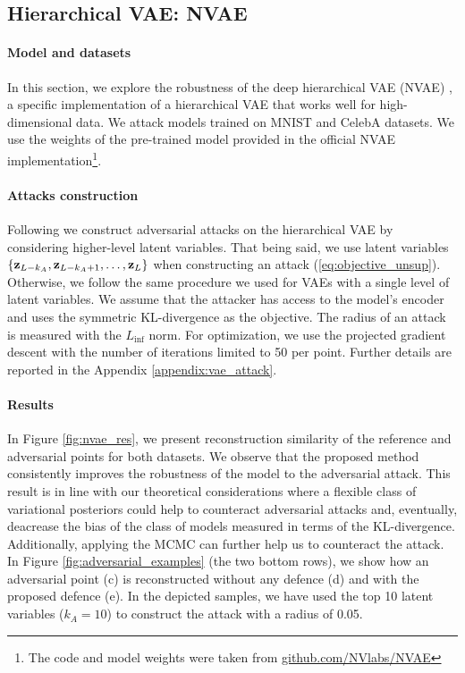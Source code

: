 {\subsection{Hierarchical VAE: NVAE}\label{sec:nvae}

\paragraph{Model and datasets} In this section, we explore the robustness of the deep hierarchical VAE (NVAE) \cite{Vahdat2020-xe}, a specific implementation of a hierarchical VAE that works well for high-dimensional data. We attack models trained on MNIST and CelebA \cite{liu2015faceattributes} datasets. We use the weights of the pre-trained model provided in the official NVAE implementation\footnote{The code and model weights were taken from \url{github.com/NVlabs/NVAE}}. 

\paragraph{Attacks construction}
Following \cite{kuzina2021adv} we construct adversarial attacks on the hierarchical VAE by considering higher-level latent variables. That being said, we use latent variables $\{{\mathbf{z}}_{L-k_A}, {\mathbf{z}}_{L-k_A+1}, \dots, {\mathbf{z}}_L\}$ when constructing an attack (\eqref{eq:objective_unsup}). Otherwise, we follow the same procedure we used for VAEs with a single level of latent variables. We assume that the attacker has access to the model's encoder and uses the symmetric KL-divergence as the objective. The radius of an attack is measured with the $L_{\inf}$ norm. For optimization, we use the projected gradient descent with the number of iterations limited to 50 per point. Further details are reported in the Appendix \ref{appendix:vae_attack}.


\paragraph{Results}
In Figure \ref{fig:nvae_res}, we present reconstruction similarity of the reference and adversarial points for both datasets. We observe that the proposed method consistently improves the robustness of the model to the adversarial attack. This result is in line with our theoretical considerations where a flexible class of variational posteriors could help to counteract adversarial attacks and, eventually, deacrease the bias of the class of models measured in terms of the KL-divergence. Additionally, applying the MCMC can further help us to counteract the attack. In Figure \ref{fig:adversarial_examples} (the two bottom rows), we show how an adversarial point (c) is reconstructed without any defence (d) and with the proposed defence (e). In the depicted samples, we have used the top 10 latent variables ($k_A = 10$) to construct the attack with a radius of 0.05. 



}
